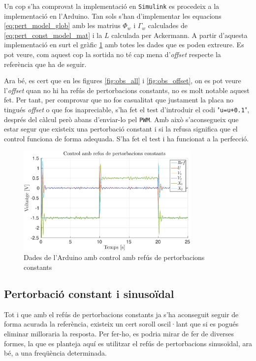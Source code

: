\documentclass[12pt,a4paper,final,twoside,openright]{report}
\begin{document}
Un cop s'ha comprovat la implementació en \texttt{Simulink} es procedeix a la implementació en l'Arduino. Tan sols s'han d'implementar les equacions \eqref{eq:pert_model_glob} amb les matrius $\Phi_w$ i $\Gamma_w$ calculades de \eqref{eq:pert_const_model_mat} i la $L$ calculada per Ackermann. A partir d'aquesta implementació en surt el gràfic \ref{fig:pert_ct_all_pols_imag} amb totes les dades que es poden extreure. Es pot veure, com aquest cop la sortida no té cap mena d'\textit{offset} respecte la referència que ha de seguir.

Ara bé, es cert que en les figures \ref{fig:obs_all} i \ref{fig:obs_offset}, on es pot veure l'\textit{offset} quan no hi ha refús de pertorbacions constants, no es molt notable aquest fet. Per tant, per comprovar que no fos casualitat que justament la placa no tingués \textit{offset} o que fos inapreciable, s'ha fet el test d'introduir el codi "\texttt{u=u+0.1}", després del càlcul però abans d'enviar-lo pel \texttt{PWM}. Amb això s'aconsegueix que estar segur que existeix una pertorbació constant i si la refusa significa que el control funciona de forma adequada. S'ha fet el test i ha funcionat a la perfecció.

\begin{figure}
\centering
\includegraphics[width=0.8\textwidth]{Imatges/pert_ct_all_pols_imag.eps}
\caption{Dades de l'Arduino amb control amb refús de pertorbacions constants\label{fig:pert_ct_all_pols_imag}}
\end{figure}

\subsection{Pertorbació constant i sinusoïdal}

Tot i que amb el refús de pertorbacions constants ja s'ha aconseguit seguir de forma acurada la referència, existeix un cert soroll oscil·lant que si es pogués eliminar milloraria la resposta. Per fer-ho, es podria mirar de fer de diverses formes, la que es planteja aquí es utilitzar el refús de pertorbacions sinusoïdal, ara bé, a una freqüència determinada.
\end{document}
